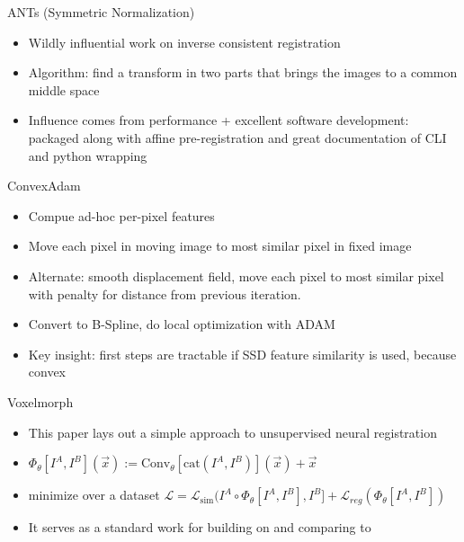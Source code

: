 \documentclass{beamer}
\begin{document}
\begin{frame}{ANTs (Symmetric Normalization)}
	\begin{itemize}
		\item Wildly influential work on inverse consistent registration
		\item Algorithm: find a transform in two parts that brings the images to a common middle space
		\item Influence comes from performance + excellent software development: packaged along with affine pre-registration and great documentation of CLI and python wrapping

	\end{itemize}
\end{frame}
\begin{frame}{ConvexAdam}
	\begin{itemize}
		\item Compue ad-hoc per-pixel features
		\item Move each pixel in moving image to most similar pixel in fixed image
		\item Alternate: smooth displacement field, move each pixel to most similar pixel with penalty for distance from previous iteration.
		\item Convert to B-Spline, do local optimization with ADAM
		\item Key insight: first steps are tractable if SSD feature similarity is used, because convex
	\end{itemize}
\end{frame}

\begin{frame}{Voxelmorph}
        \begin{itemize}
              \item This paper lays out a simple approach to unsupervised neural registration
		\item $ \Phi_\theta[I^A, I^B](\vec{x}) := \text{Conv}_\theta[\text{cat}(I^A, I^B)](\vec{x}) + \vec{x} $
		\item minimize over a dataset $\mathcal{L} = \mathcal{L}_\text{sim}(I^A \circ \Phi_\theta[I^A, I^B], I^B] + \mathcal{L}_{reg}(\Phi_\theta[I^A, I^B])$
              \item It serves as a standard work for building on and comparing to

        \end{itemize}
\end{frame}
\end{document}
